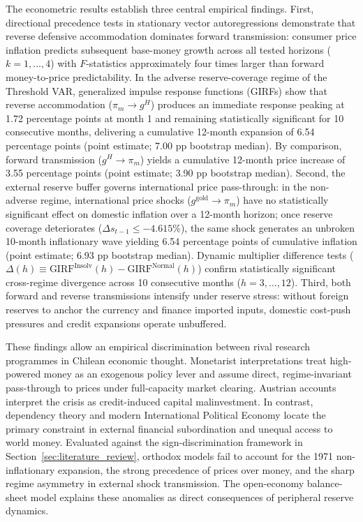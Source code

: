 The econometric results establish three central empirical findings. First, directional precedence tests in stationary vector autoregressions demonstrate that reverse defensive accommodation dominates forward transmission: consumer price inflation predicts subsequent base-money growth across all tested horizons ($k=1,\dots,4$) with $F$-statistics approximately four times larger than forward money-to-price predictability. In the adverse reserve-coverage regime of the Threshold VAR, generalized impulse response functions (GIRFs) show that reverse accommodation ($\pi_m \to g^H$) produces an immediate response peaking at 1.72 percentage points at month 1 and remaining statistically significant for 10 consecutive months, delivering a cumulative 12-month expansion of 6.54 percentage points (point estimate; 7.00 pp bootstrap median). By comparison, forward transmission ($g^H \to \pi_m$) yields a cumulative 12-month price increase of 3.55 percentage points (point estimate; 3.90 pp bootstrap median). Second, the external reserve buffer governs international price pass-through: in the non-adverse regime, international price shocks ($g^{\text{gold}} \to \pi_m$) have no statistically significant effect on domestic inflation over a 12-month horizon; once reserve coverage deteriorates ($\Delta s_{t-1} \le -4.615\%$), the same shock generates an unbroken 10-month inflationary wave yielding 6.54 percentage points of cumulative inflation (point estimate; 6.93 pp bootstrap median). Dynamic multiplier difference tests ($\Delta(h) \equiv \text{GIRF}^{\text{Insolv}}(h) - \text{GIRF}^{\text{Normal}}(h)$) confirm statistically significant cross-regime divergence across 10 consecutive months ($h=3,\dots,12$). Third, both forward and reverse transmissions intensify under reserve stress: without foreign reserves to anchor the currency and finance imported inputs, domestic cost-push pressures and credit expansions operate unbuffered.

These findings allow an empirical discrimination between rival research programmes in Chilean economic thought. Monetarist interpretations \citep{Edwards2024} treat high-powered money as an exogenous policy lever and assume direct, regime-invariant pass-through to prices under full-capacity market clearing. Austrian accounts \citep{EspinosaVejar2025} interpret the crisis as credit-induced capital malinvestment. In contrast, dependency theory \citep{Prebisch1950,Marini1973,Kvangraven2021} and modern International Political Economy \citep{Vasudevan2009,Basu2022} locate the primary constraint in external financial subordination and unequal access to world money. Evaluated against the sign-discrimination framework in Section~\ref{sec:literature_review}, orthodox models fail to account for the 1971 non-inflationary expansion, the strong precedence of prices over money, and the sharp regime asymmetry in external shock transmission. The open-economy balance-sheet model explains these anomalies as direct consequences of peripheral reserve dynamics.

